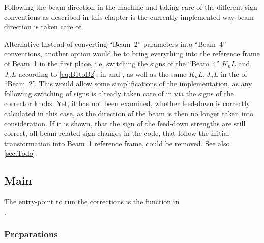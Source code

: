 Following the beam direction in the machine and taking care of the different sign conventions
as described in this chapter is the currently implemented way beam direction is taken care of.

\begin{important}
        \item[\raisedtaget{Alternative:SwitchBeamSigns}\color{AtlasGreen} Alternative]
        Instead of converting ``Beam~2'' parameters into ``Beam~4'' conventions,  
        another option would be to bring everything into the reference frame of Beam~1 in the first place, 
        i.e. switching the signs of the ``Beam~4'' $K_nL$ and $J_nL$ according to \cref{eq:B1toB2}, 
        in  and , as well as the same $K_nL, J_nL$ in the  of ``Beam~2''.
        This would allow some simplifications of the implementation, 
        as any following switching of signs is already taken care of in  via the 
        signs of the corrector knobs.
        Yet, it has not been examined, whether feed-down is correctly calculated in this case, 
        as the direction of the beam is then no longer taken into consideration.
        If it is shown, that the sign of the feed-down strengths are still correct,
        all beam related sign changes in the code, 
        that follow the initial transformation into Beam~1 reference frame, could be removed.
        See also \cref{sec:Todo}.
\end{important}

\subsection{Main}
The entry-point to run the corrections is the  function in \\
.


\subsubsection{Preparations}
\label{sec:Preparations}

